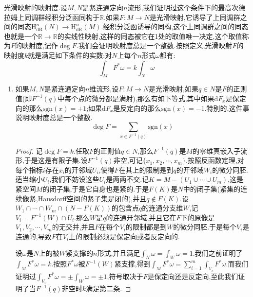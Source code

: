 光滑映射的映射度.设$M,N$是紧连通定向$n$流形,我们证明过这个条件下的最高次德拉姆上同调群经积分泛函同构于$\mathbb{R}$.如果$F:M\to N$是光滑映射,它诱导了上同调群之间的同态$\mathrm{H}^n_{\mathrm{dR}}(N)\to\mathrm{H}^n_{\mathrm{dR}}(M)$.经积分泛函诱导的同构,这个上同调群之间的同态也就是一个$\mathbb{R}\to\mathbb{R}$的实线性映射,这样的同态被它在1处的取值唯一决定,这个取值称为$F$的映射度,记作$\deg F$.我们会证明映射度总是一个整数.按照定义,光滑映射$F$的映射度$k$就是满足如下条件的实数:对$N$上每个$n$形式$\omega$都有:$$\int_MF^*\omega=k\int_N\omega$$
\begin{enumerate}
	\item 如果$M,N$是紧连通定向$n$维流形,设$F:M\to N$是光滑映射,如果$q\in N$是$F$的正则值(即$F^{-1}(q)$中每个点的微分都是满射),那么有如下等式,其中如果$\mathrm{d}F_x$是保定向的那么$\mathrm{sgn}(x)=+1$;如果$\mathrm{d}F_x$是反定向的那么$\mathrm{sgn}(x)=-1$.特别的,这件事说明映射度总是一个整数.
	$$\deg F=\sum_{x\in F^{-1}(q)}\mathrm{sgn}(x)$$
    \begin{proof}
    	
    	记$\deg F=k$.任取$F$的正则值$q\in N$,那么$F^{-1}(q)$是$M$的零维真嵌入子流形,于是这是有限子集.设$F^{-1}(q)$非空,可记$\{x_1,x_2,\cdots,x_m\}$.按照反函数定理,对每个指标$i$存在$x_i$的开邻域$U_i$,使得$F$在其上的限制是到$q$的开邻域$W_i$的微分同胚.适当缩小$U_i$,我们不妨设这些$U_i$是两两不交.记$K=M-(U_1\cup\cdots\cup U_m)$,这是紧空间$M$的闭子集,于是它自身也是紧的.于是$F(K)$是$N$中的闭子集(紧集的连续像紧,Hausdorff空间的紧子集是闭的),并且$q\not\in F(K)$.设$W_1\cap\cdots\cap W_m\cap(N-F(K))$的包含点$q$的连通分支维$W$,记$V_i=F^{-1}(W)\cap U_i$.那么$W$是$q$的连通开邻域,并且它在$F$下的原像是$V_1,V_2,\cdots,V_m$的无交并,并且$F$在每个$V_i$的限制都是到$W$的微分同胚.于是每个$V_i$是连通的,导致$F$在$V_i$上的限制必须是保定向或者反定向的.
    	
    	设$\omega$是$N$上的被$W$紧支撑的$n$形式,并且满足$\int_N\omega=\int_W\omega=1$.我们之前证明了$\int_MF^*\omega=k$.按照$F^*\omega$被$F^{-1}(W)$紧支撑,得到$\int_MF^*\omega=\sum_{i=1}^m\int_{V_i}F^*\omega$.而我们证明过$\int_{V_i}F^*\omega=\pm\int_W\omega=\pm1$,符号取决于$F$是保定向还是反定向,至此我们证明了当$F^{-1}(q)$非空时$k$满足第二条.
    	

\end{proof}
\end{enumerate}
